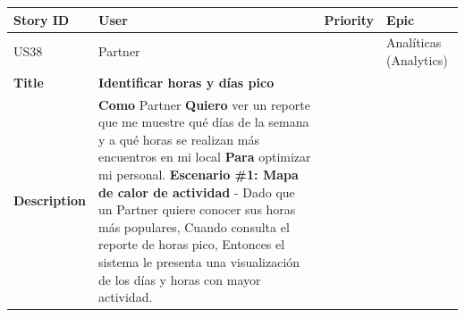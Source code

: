 {\def\LTcaptype{none} %
\begin{longtable}[]{@{}
  >{\raggedright\arraybackslash}p{}
  >{\raggedright\arraybackslash}p{}
  >{\raggedright\arraybackslash}p{}
  >{\raggedright\arraybackslash}p{}@{}}
\toprule\noalign{}
\begin{minipage}[b]{\linewidth}\raggedright
Story ID
\end{minipage} & \begin{minipage}[b]{\linewidth}\raggedright
User
\end{minipage} & \begin{minipage}[b]{\linewidth}\raggedright
Priority
\end{minipage} & \begin{minipage}[b]{\linewidth}\raggedright
Epic
\end{minipage} \\
\midrule\noalign{}
\endhead
\bottomrule\noalign{}
\endlastfoot
US38 & Partner & 8 & Analíticas (Analytics) \\
\textbf{Title} & \textbf{Identificar horas y días pico} & & \\
\textbf{Description} & \textbf{Como} Partner \textbf{Quiero} ver un
reporte que me muestre qué días de la semana y a qué horas se realizan
más encuentros en mi local \textbf{Para} optimizar mi personal.
\textbf{Escenario \#1: Mapa de calor de actividad} - Dado que un Partner
quiere conocer sus horas más populares, Cuando consulta el reporte de
horas pico, Entonces el sistema le presenta una visualización de los
días y horas con mayor actividad. & & \\
\end{longtable}
}

